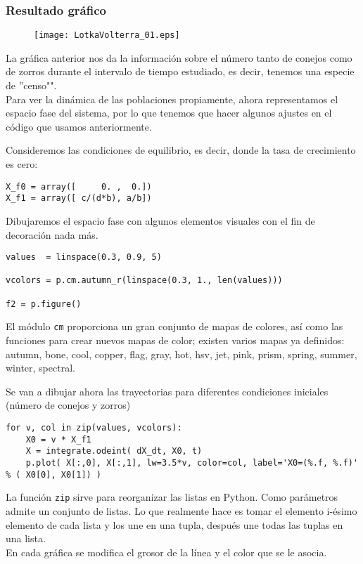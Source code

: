 \begin{frame}
\frametitle{Resultado gr\'{a}fico}
\begin{figure}
	\centering
	\texttt{[image: LotkaVolterra\_01.eps]} 
\end{figure}
\end{frame}
\begin{frame}
La gr\'{a}fica anterior nos da la informaci\'{o}n sobre el n\'{u}mero tanto de conejos como de zorros durante el intervalo de tiempo estudiado, es decir, tenemos una especie de ''censo"".
\\
\medskip
Para ver la din\'{a}mica de las poblaciones propiamente, ahora representamos el espacio fase del sistema, por lo que tenemos que hacer algunos ajustes en el c\'{o}digo que usamos anteriormente.
\end{frame}
\begin{frame}[fragile]
Consideremos las condiciones de equilibrio, es decir, donde la tasa de crecimiento es cero:
\begin{lstlisting}
X_f0 = array([     0. ,  0.])
X_f1 = array([ c/(d*b), a/b])
\end{lstlisting}
\end{frame}
\begin{frame}[fragile]
Dibujaremos el espacio fase con algunos elementos visuales con el fin de decoraci\'{o}n nada m\'{a}s.
\begin{lstlisting}
values  = linspace(0.3, 0.9, 5)                         

vcolors = p.cm.autumn_r(linspace(0.3, 1., len(values)))  

f2 = p.figure()
\end{lstlisting}
El m\'{o}dulo \texttt{cm} proporciona un gran conjunto de mapas de colores, as\'{i} como las funciones para crear nuevos mapas de color; existen varios mapas ya definidos: autumn, bone, cool, copper, flag, gray, hot, hsv, jet, pink, prism, spring, summer, winter, spectral.
\end{frame}
\begin{frame}[fragile]
Se van a dibujar ahora las trayectorias para diferentes condiciones iniciales (n\'{u}mero de conejos y zorros)
\begin{lstlisting}
for v, col in zip(values, vcolors):
    X0 = v * X_f1
    X = integrate.odeint( dX_dt, X0, t)
    p.plot( X[:,0], X[:,1], lw=3.5*v, color=col, label='X0=(%.f, %.f)' % ( X0[0], X0[1]) )
\end{lstlisting}
La funci\'{o}n \texttt{zip} sirve para reorganizar las listas en Python. Como par\'{a}metros admite un conjunto de listas. Lo que realmente hace es tomar el elemento i-\'{e}simo elemento de cada lista y los une en una tupla, despu\'{e}s une todas las tuplas en una lista.
\\
\medskip
En cada gr\'{a}fica se modifica el grosor de la l\'{i}nea y el color que se le asocia.
\end{frame}

